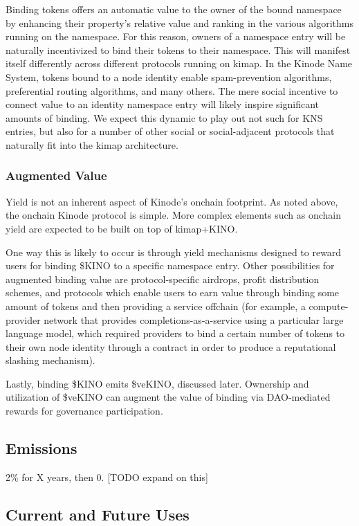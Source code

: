 \documentclass[runningheads]{llncs}
\begin{document}
Binding tokens offers an automatic value to the owner of the bound namespace by enhancing their property's relative value and ranking in the various algorithms running on the namespace.
For this reason, owners of a namespace entry will be naturally incentivized to bind their tokens to their namespace.
This will manifest itself differently across different protocols running on kimap.
In the Kinode Name System, tokens bound to a node identity enable spam-prevention algorithms, preferential routing algorithms, and many others.
The mere social incentive to connect value to an identity namespace entry will likely inspire significant amounts of binding.
We expect this dynamic to play out not such for KNS entries, but also for a number of other social or social-adjacent protocols that naturally fit into the kimap architecture.

\subsubsection{Augmented Value}

Yield is not an inherent aspect of Kinode's onchain footprint.
As noted above, the onchain Kinode protocol is simple.
More complex elements such as onchain yield are expected to be built on top of kimap+KINO.

One way this is likely to occur is through yield mechanisms designed to reward users for binding \$KINO to a specific namespace entry. Other possibilities for augmented binding value are protocol-specific airdrops, profit distribution schemes, and protocols which enable users to earn value through binding some amount of tokens and then providing a service offchain (for example, a compute-provider network that provides completions-as-a-service using a particular large language model, which required providers to bind a certain number of tokens to their own node identity through a contract in order to produce a reputational slashing mechanism).

Lastly, binding \$KINO emits \$veKINO, discussed later.
Ownership and utilization of \$veKINO can augment the value of binding via DAO-mediated rewards for governance participation.

\subsection{Emissions}

2\% for X years, then 0. [TODO expand on this]

\subsection{Current and Future Uses}
\end{document}
